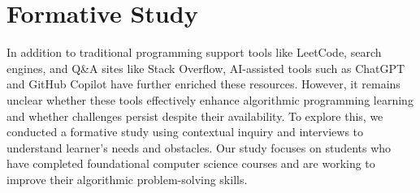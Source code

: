 

\section{Formative Study}
In addition to traditional programming support tools like LeetCode, search engines, and Q\&A sites like Stack Overflow, AI-assisted tools such as ChatGPT and GitHub Copilot have further enriched these resources. 
However, it remains unclear whether these tools effectively enhance algorithmic programming learning and whether challenges persist despite their availability.
To explore this, we conducted a formative study using contextual inquiry and interviews to understand learner's needs and obstacles. 
Our study focuses on students who have completed foundational computer science courses and are working to improve their algorithmic problem-solving skills. 











